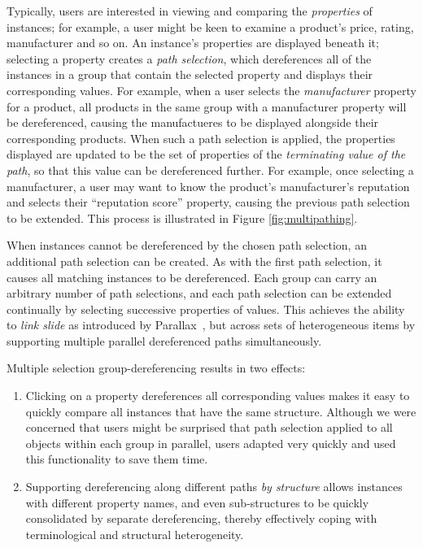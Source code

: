 \documentclass{sigchi}
\begin{document}
Typically, users are interested in viewing and comparing the \emph{properties} of instances; for example, a user might be keen to examine a product's price, rating, manufacturer and so on.  An instance's properties are displayed beneath it; selecting a property creates a \emph{path selection}, which dereferences all of the instances in a group that contain the selected property and displays their corresponding values.  For example, when a user selects the \emph{manufacturer} property for a product, all products in the same group with a manufacturer property will be dereferenced, causing the manufactueres to be displayed alongside their corresponding products.  When such a path selection is applied, the properties displayed are updated to be the set of properties of the \emph{terminating value of the path}, so that this value can be dereferenced further.  For example, once selecting a manufacturer, a user may want to know the product's manufacturer's reputation and selects their ``reputation score'' property, causing the previous path selection to be extended. This process is illustrated in Figure \ref{fig:multipathing}.

When instances cannot be dereferenced by the chosen path selection, an additional path selection can be created. As with the first path selection, it causes all matching instances to be dereferenced.  Each group can carry an arbitrary number of path selections, and each path selection can be extended continually by selecting successive properties of values. This achieves the ability to \emph{link slide} as introduced by Parallax~\cite{parallax}, but across sets of heterogeneous items by supporting multiple parallel dereferenced paths simultaneously.  

Multiple selection group-dereferencing results in two effects: 

\begin{enumerate}
\item Clicking on a property dereferences all corresponding values makes it easy to quickly compare all instances that have the same structure.  Although we were concerned that users might be surprised that path selection applied to all objects within each group in parallel, users adapted very quickly and used this functionality to save them time.   

\item Supporting dereferencing along different paths \emph{by structure} allows instances with different property names, and even sub-structures to be quickly consolidated by separate dereferencing, thereby effectively coping with terminological and structural heterogeneity.
\end{enumerate}
\end{document}
